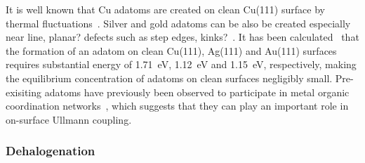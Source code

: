 \documentclass[%
 reprint,
 amsmath,amssymb,
 aps,
prb,
floatfix,
]{revtex4-2}
\newcommand{\comm}{\color{Purple}} %
\begin{document}
{%

It is well known that Cu adatoms are created on clean Cu(111) surface by thermal fluctuations~\cite{ullmann_79, ullmann_58}. Silver and gold adatoms can be also be created especially near {\comm line, planar?} defects such as {\comm step edges, kinks?}~\cite{ullmann_84, ullmann_85}. 
It has been calculated~\cite{chemeurope2017} that the formation of an adatom on clean Cu(111), Ag(111) and Au(111) surfaces requires substantial energy of \SI{1.71}{\electronvolt}, \SI{1.12}{\electronvolt} and \SI{1.15}{\electronvolt}, respectively, making the equilibrium concentration of adatoms on clean surfaces negligibly small.  
Pre-exisiting adatoms have previously been observed to participate in metal organic coordination networks~\cite{ullmann_80, ullmann_81, ullmann_82, ullmann_83}, which suggests that they can play an important role in on-surface Ullmann coupling.


}

\ifdefined\INTERNAL

\subsubsection{Dehalogenation}
\end{document}
